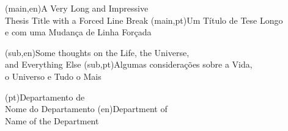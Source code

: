 
%


\nttitle(main,en){A Very Long and Impressive\\Thesis Title with a Forced Line Break}%
\nttitle(main,pt){Um Título de Tese Longo\\e com uma Mudança de Linha Forçada}%

\nttitle(sub,en){Some thoughts on the Life, the Universe,\\and Everything Else}%
\nttitle(sub,pt){Algumas considerações sobre a Vida,\\o Universo e Tudo o Mais}%


\ntdepartment*(pt){Departamento de\\Nome do Departamento}
\ntdepartment*(en){Department of\\Name of the Department}

